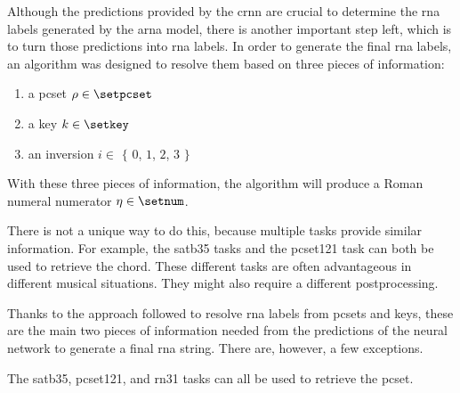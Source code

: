 
Although the predictions provided by the \gls{crnn} are
crucial to determine the \gls{rna} labels generated by the
\gls{arna} model, there is another important step left,
which is to turn those predictions into \gls{rna} labels. In
order to generate the final \gls{rna} labels, an algorithm
was designed to resolve them based on three pieces of
information: 
\begin{enumerate}
    \item a \gls{pcset} $\rho \in \setpcset$
    \item a key $k \in \setkey$
    \item an inversion $i \in$ $\{$ $0$, $1$, $2$, $3$ $\}$
\end{enumerate}

With these three pieces of information, the \algorithmrn{}
algorithm will produce a Roman numeral numerator $\eta \in
\setnum$.

There is not a unique way to do this, because multiple tasks
provide similar information. For example, the \gls{satb35}
tasks and the \gls{pcset121} task can both be used to
retrieve the chord. These different tasks are often
advantageous in different musical situations. They might
also require a different postprocessing.

Thanks to the approach followed to resolve \gls{rna} labels
from \gls{pcset}s and keys, these are the main two pieces of
information needed from the predictions of the neural
network to generate a final \gls{rna} string. There are,
however, a few exceptions.

The \gls{satb35}, \gls{pcset121}, and \gls{rn31} tasks can
all be used to retrieve the \gls{pcset}.





